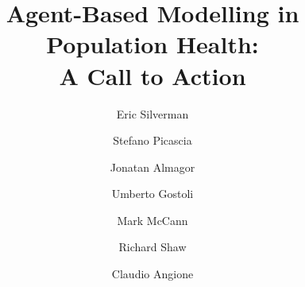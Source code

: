 \documentclass[review]{elsarticle}
\begin{document}
\begin{frontmatter}

\title{Agent-Based Modelling in Population Health:\\ A Call to Action}

\author[mymainaddress]{Eric Silverman}
\author[mymainaddress]{Stefano Picascia}
\author[mymainaddress]{Jonatan Almagor}
\author[mymainaddress]{Umberto Gostoli}
\author[mymainaddress]{Mark McCann}
\author[mysecondaryaddress]{Richard Shaw}
\author[mytertiaryaddress]{Claudio Angione}







\address[mymainaddress]{MRC/CSO Social and Public Health Sciences Unit, University of Glasgow, 200 Renfield Street, Glasgow G2 3AX, UK}
\address[mysecondaryaddress]{Institute of Health and Wellbeing, University of Glasgow, Glasgow G12 8RZ, UK}
\address[mytertiaryaddress]{Department of Computer Science and Information Systems, Teesside University, Middlesbrough, TS1 3BX, UK}


\end{frontmatter}
\end{document}
